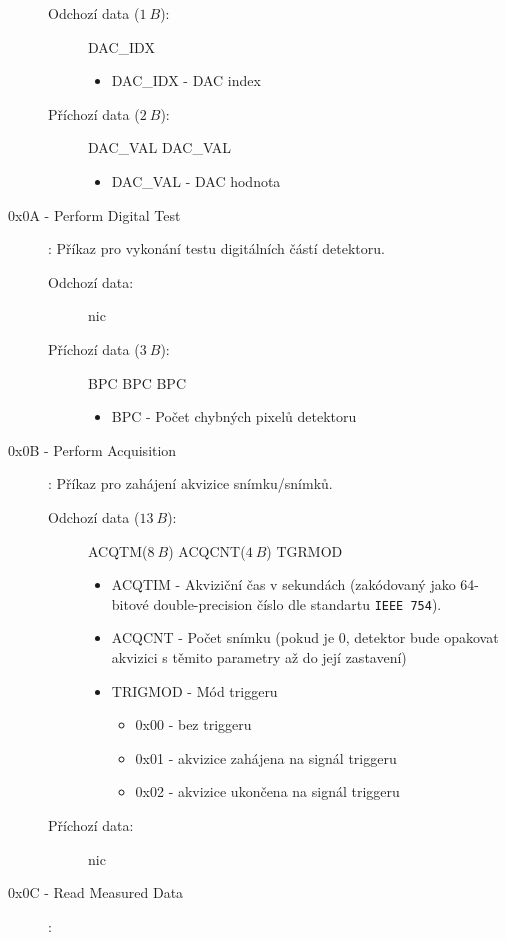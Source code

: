 \begin{description}
\begin{description}
			\item[Odchozí data ($1~B$):] DAC\_IDX
				\begin{itemize}
					\item DAC\_IDX - DAC index
				\end{itemize}
			\item[Příchozí data ($2~B$):] DAC\_VAL DAC\_VAL
				\begin{itemize}
					\item DAC\_VAL - DAC hodnota
				\end{itemize}
		\end{description}
	\item[0x0A - Perform Digital Test]:
		Příkaz pro vykonání testu digitálních částí detektoru.
		\begin{description}
			\item[Odchozí data:] nic
			\item[Příchozí data ($3~B$):] BPC BPC BPC
				\begin{itemize}
					\item BPC - Počet chybných pixelů detektoru
				\end{itemize}
		\end{description}
	\item[0x0B - Perform Acquisition]:
		Příkaz pro zahájení akvizice snímku/snímků.
		\begin{description}
			\item[Odchozí data ($13~B$):] ACQTM($8~B$) ACQCNT($4~B$) TGRMOD
				\begin{itemize}
					\item ACQTIM - Akviziční čas v sekundách (zakódovaný jako 64-bitové double-precision číslo dle standartu \texttt{IEEE 754}).
					\item ACQCNT - Počet snímku (pokud je 0, detektor bude opakovat akvizici s těmito parametry až do její zastavení)
					\item TRIGMOD - Mód triggeru
						\begin{itemize}
							\item 0x00 - bez triggeru
							\item 0x01 - akvizice zahájena na signál triggeru
							\item 0x02 - akvizice ukončena
							 na signál triggeru
						\end{itemize}
				\end{itemize}
			\item[Příchozí data:] nic
		\end{description}
	\item[0x0C - Read Measured Data]:

\end{description}
